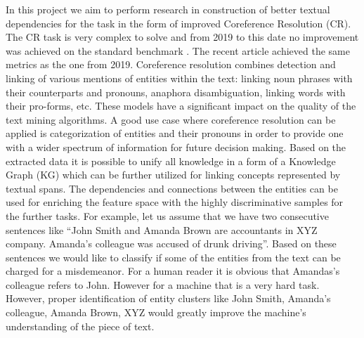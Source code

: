 In this project we aim to perform research in construction of better textual dependencies for the task in the form of improved Coreference Resolution (CR). The CR task is very complex to solve and from 2019 to this date \cite{spanbert-Joshi2020} no improvement was achieved on the standard benchmark \cite{ontonotes5-Weischedel2013}. The recent article \cite{cr-Toshniwal2020} achieved the same metrics as the one from 2019. Coreference resolution combines detection and linking of various mentions of entities within the text: linking noun phrases with their counterparts and pronouns, anaphora disambiguation, linking words with their pro-forms, etc.  These models have a significant impact on the quality of the text mining algorithms. A good use case where  coreference resolution can be applied is categorization of entities and their pronouns in order to provide one with a wider spectrum of information for future decision making. Based on the extracted data it is possible to unify all knowledge in a form of a Knowledge Graph (KG) \cite{kg-Wang2017} which can be further utilized for linking concepts represented by textual spans. The dependencies and connections between the entities can be used for enriching the feature space with the highly discriminative samples for the further tasks. 
For example, let us assume that we have two consecutive sentences like “John Smith and Amanda Brown are accountants in XYZ company. Amanda’s colleague was accused of drunk driving”. Based on these sentences we would like to classify if some of the entities from the text can be charged for a misdemeanor. For a human reader it is obvious that Amandas’s colleague refers to John. However for a machine that is a very hard task. However, proper identification of entity clusters like {John Smith, Amanda’s colleague}, {Amanda Brown}, {XYZ} would greatly improve the machine’s understanding of the piece of text.

